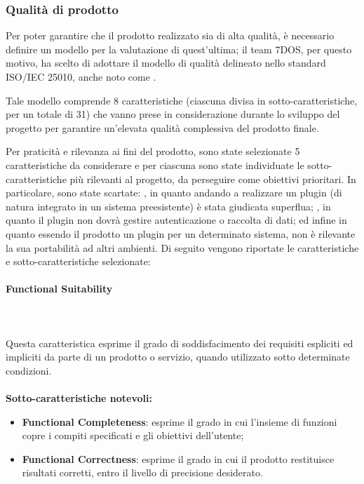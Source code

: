 \subsubsection{Qualità di prodotto}
Per poter garantire che il prodotto realizzato sia di alta qualità, è necessario definire un modello per la valutazione di quest'ultima; il team 7DOS, per questo motivo, ha scelto di adottare il modello di qualità delineato nello standard ISO/IEC 25010, anche noto come .

Tale modello comprende 8 caratteristiche (ciascuna divisa in sotto-caratteristiche, per un totale di 31) che vanno prese in considerazione durante lo sviluppo del progetto per garantire un'elevata qualità complessiva del prodotto finale.

Per praticità e rilevanza ai fini del prodotto, sono state selezionate 5 caratteristiche da considerare e per ciascuna sono state individuate le sotto-caratteristiche più rilevanti al progetto, da perseguire come obiettivi prioritari. In particolare, sono state scartate: , in quanto andando a realizzare un plugin (di natura integrato in un sistema preesistente) è stata giudicata superflua; , in quanto il plugin non dovrà gestire autenticazione o raccolta di dati; ed infine  in quanto essendo il prodotto un plugin per un determinato sistema, non è rilevante la sua portabilità ad altri ambienti. 
Di seguito vengono riportate le caratteristiche e sotto-caratteristiche selezionate:
\paragraph{Functional Suitability} ~\\ ~\\
Questa caratteristica esprime il grado di soddisfacimento dei requisiti espliciti ed impliciti da parte di un prodotto o servizio, quando utilizzato sotto determinate condizioni.\\ \\
\textbf{Sotto-caratteristiche notevoli:}
\begin{itemize}
	\item{\textbf{Functional Completeness}}: esprime il grado in cui l'insieme di funzioni copre i compiti specificati e gli obiettivi dell'utente;
	\item{\textbf{Functional Correctness}}: esprime il grado in cui il prodotto restituisce risultati corretti, entro il livello di precisione desiderato.
\end{itemize}

